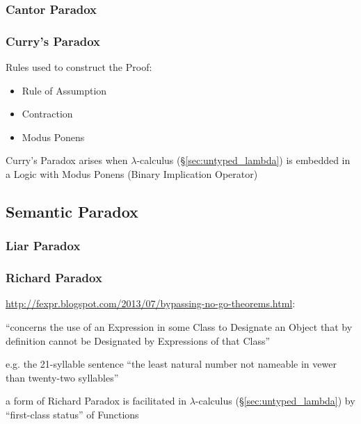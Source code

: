 \subsubsection{Cantor Paradox}\label{sec:cantor_paradox}

\subsubsection{Curry's Paradox}\label{sec:currys_paradox}

Rules used to construct the Proof:
\begin{itemize}
  \item Rule of Assumption
  \item Contraction
  \item Modus Ponens
\end{itemize}

Curry's Paradox arises when $\lambda$-calculus
(\S\ref{sec:untyped_lambda}) is embedded in a Logic with Modus Ponens
(Binary Implication Operator)



\subsection{Semantic Paradox}\label{sec:semantic_paradox}

\subsubsection{Liar Paradox}\label{sec:liar_paradox}

\subsubsection{Richard Paradox}\label{sec:richard_paradox}

\url{http://fexpr.blogspot.com/2013/07/bypassing-no-go-theorems.html}:

``concerns the use of an Expression in some Class to Designate an
Object that by definition cannot be Designated by Expressions of that
Class''

e.g. the 21-syllable sentence ``the least natural number not nameable
in vewer than twenty-two syllables''

a form of Richard Paradox is facilitated in $\lambda$-calculus
(\S\ref{sec:untyped_lambda}) by ``first-class status'' of Functions



